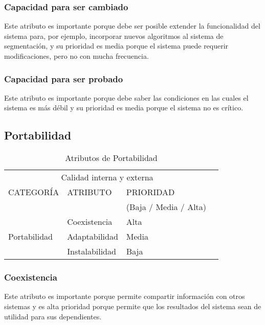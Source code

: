 \documentclass[12pt]{article}
\begin{document}
\subsubsection{Capacidad para ser cambiado}
\vspace*{0.2in}
Este atributo es importante porque debe ser posible extender la funcionalidad del sistema para, por ejemplo, incorporar nuevos algoritmos al sistema de segmentación, y su prioridad es media porque el sistema puede requerir modificaciones, pero no con mucha frecuencia.
\subsubsection{Capacidad para ser probado}
\vspace*{0.2in}
Este atributo es importante porque debe saber las condiciones en las cuales el sistema es más débil y su prioridad es media porque el sistema no es crítico.\\[100 cm]

\vspace*{0.3in}

\subsection{Portabilidad}
\vspace*{0.3in}
\begin{table}[htb]%
\centering
\begin{tabular}{|l|l|l|l|}
\hline
\multicolumn{3}{|c|}{Calidad interna y externa   } \\
\cline{1-3}
CATEGORÍA & ATRIBUTO & PRIORIDAD\\ & & (Baja / Media / Alta)\\
\hline \hline
\multirow{3}{3cm}{Portabilidad} & Coexistencia & Alta \\ \cline{2-3}
& Adaptabilidad &  Media\\ \cline{2-3}
& Instalabilidad & Baja\\ \cline{1-3}
\end{tabular}
\caption{Atributos de Portabilidad}
\label{tabla:final}
\end{table}%
\subsubsection{Coexistencia }
\vspace*{0.2in}
Este atributo es importante porque permite compartir información con otros sistemas y es alta prioridad porque permite que los resultados del sistema sean de utilidad para sus dependientes.
\end{document}
